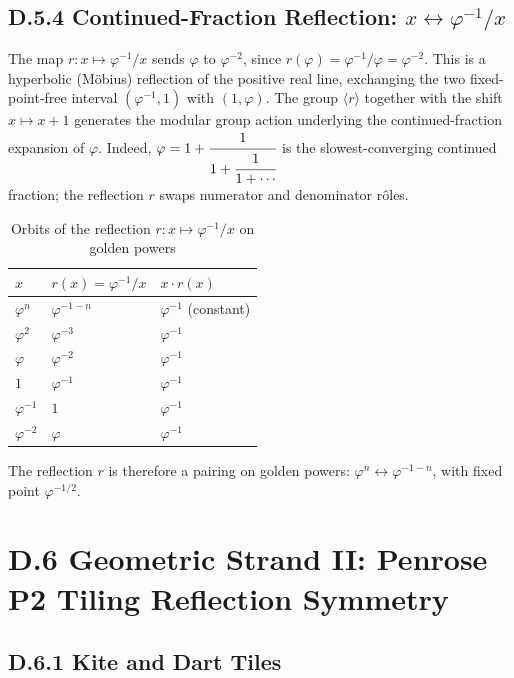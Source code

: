 \subsection*{D.5.4  Continued-Fraction Reflection: $x \leftrightarrow \varphi^{-1}/x$}

The map $r: x \mapsto \varphi^{-1}/x$ sends $\varphi$ to $\varphi^{-2}$, since
$r(\varphi) = \varphi^{-1}/\varphi = \varphi^{-2}$.
This is a hyperbolic (Möbius) reflection of the positive real line, exchanging
the two fixed-point-free interval $(\varphi^{-1}, 1)$ with $(1, \varphi)$.
The group $\langle r \rangle$ together with the shift $x\mapsto x+1$ generates
the modular group action underlying the continued-fraction expansion of $\varphi$.
Indeed, $\varphi = 1 + \cfrac{1}{1+\cfrac{1}{1+\cdots}}$ is the slowest-converging
continued fraction; the reflection $r$ swaps numerator and denominator rôles.

\begin{table}[h]
\centering
\caption{Orbits of the reflection $r: x\mapsto\varphi^{-1}/x$ on golden powers}
\begin{tabular}{lll}
\toprule
$x$ & $r(x) = \varphi^{-1}/x$ & $x\cdot r(x)$ \\
\midrule
$\varphi^n$ & $\varphi^{-1-n}$ & $\varphi^{-1}$ (constant) \\
$\varphi^2$ & $\varphi^{-3}$ & $\varphi^{-1}$ \\
$\varphi$ & $\varphi^{-2}$ & $\varphi^{-1}$ \\
$1$ & $\varphi^{-1}$ & $\varphi^{-1}$ \\
$\varphi^{-1}$ & $1$ & $\varphi^{-1}$ \\
$\varphi^{-2}$ & $\varphi$ & $\varphi^{-1}$ \\
\bottomrule
\end{tabular}
\end{table}

\noindent The reflection $r$ is therefore a pairing on golden powers:
$\varphi^n \leftrightarrow \varphi^{-1-n}$, with fixed point $\varphi^{-1/2}$.

\section*{D.6  Geometric Strand II: Penrose P2 Tiling Reflection Symmetry}

\subsection*{D.6.1  Kite and Dart Tiles}

